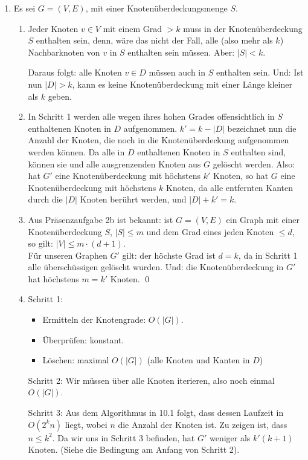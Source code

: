 \documentclass[a4paper]{scrartcl}
\begin{document}
\begin{enumerate}[label=\bfseries \arabic*.]
\item %
    Es sei $G = (V, E)$, mit einer Knotenüberdeckungsmenge $S$.

\begin{enumerate}
    \item %
        Jeder Knoten $v \in V$ mit einem Grad $> k$ muss in der
        Knotenüberdeckung $S$ enthalten sein, denn, wäre das nicht der Fall,
        alle (also mehr als $k$) Nachbarknoten von $v$ in $S$ enthalten sein müssen.
        Aber: $|S| < k$.

        Daraus folgt: alle Knoten $v \in D$ müssen auch in $S$ enthalten sein.
        Und: Ist nun $|D| > k$, kann es keine Knotenüberdeckung mit einer Länge
        kleiner als $k$ geben.

    \item %
        In Schritt 1 werden alle wegen ihres hohen Grades offensichtlich in $S$
        enthaltenen Knoten in $D$ aufgenommen. $k' = k - |D|$ bezeichnet nun die
        Anzahl der Knoten, die noch in die Knotenüberdeckung aufgenommen werden
        können. Da alle in $D$ enthaltenen Knoten in $S$ enthalten sind, können
        sie und alle ausgrenzenden Knoten aus $G$ gelöscht werden.
        Also: hat $G'$ eine Knotenüberdeckung mit höchstens $k'$ Knoten,
        so hat $G$ eine Knotenüberdeckung mit höchstens $k$ Knoten, da alle entfernten
        Kanten durch die $|D|$ Knoten berührt werden, und $|D| + k' = k$.

    \item %
        Aus Präsenzaufgabe 2b ist bekannt: ist $G = (V, E)$ ein Graph mit einer
        Knotenüberdeckung $S$, $|S| \leq m$ und dem Grad eines jeden Knoten
        $\leq d$, so gilt: $|V| \leq m \cdot (d+1)$.
        \\
        Für unseren Graphen $G'$ gilt: der höchste Grad ist $d = k$, da in Schritt 1
        alle überschüssigen gelöscht wurden. Und: die Knotenüberdeckung in $G'$
        hat höchstens $m = k'$ Knoten.
        \qed

    \item %
        Schritt 1:
        \begin{itemize}
            \item Ermitteln der Knotengrade: $O(|G|)$.
            \item Überprüfen: konstant.
            \item Löschen: maximal $O(|G|)$ (alle Knoten und Kanten in $D$)
        \end{itemize}

        Schritt 2:
        Wir müssen über alle Knoten iterieren, also noch einmal $O(|G|)$.

        Schritt 3:
        Aus dem Algorithmus in 10.1 folgt, dass dessen Laufzeit in $O(2^k n)$ liegt,
        wobei $n$ die Anzahl der Knoten ist. Zu zeigen ist, dass $n \leq k^2$.
        Da wir uns in Schritt 3 befinden, hat $G'$ weniger als $k'(k+1)$ Knoten.
        (Siehe die Bedingung am Anfang von Schritt 2).

\end{enumerate}
\end{enumerate}
\end{document}
